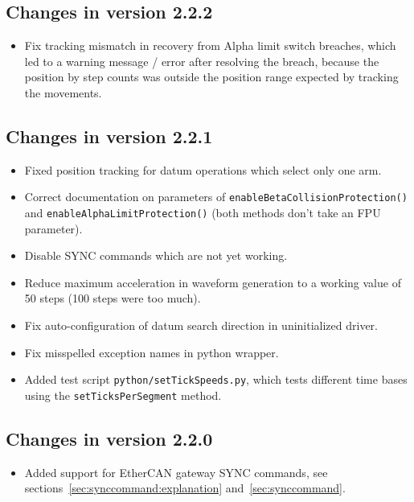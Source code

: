 \documentclass[fontsize=12,a4paper]{scrreprt}
\begin{document}
\subsection*{Changes in version 2.2.2}
\begin{itemize}
\item Fix tracking mismatch in recovery from
  Alpha limit switch breaches, which led to a
  warning message / error after resolving the breach,
  because the position by step counts was outside
  the position range expected by tracking the
  movements.
\end{itemize}

\subsection*{Changes in version 2.2.1}
\begin{itemize}
\item Fixed position tracking for datum operations
  which select only one arm.
\item Correct documentation on parameters of \texttt{enableBetaCollisionProtection()}
  and \texttt{enableAlphaLimitProtection()} (both methods don't take an
  FPU parameter).
\item Disable SYNC commands which are not yet working.
\item Reduce maximum acceleration in waveform generation to
  a working value of 50 steps (100 steps were too much).
\item Fix auto-configuration of datum search direction
  in uninitialized driver.
\item Fix misspelled exception names in python wrapper.
\item Added test script \texttt{python/setTickSpeeds.py}, which tests
  different time bases using the \texttt{setTicksPerSegment} method.
\end{itemize}


\subsection*{Changes in version 2.2.0}
\begin{itemize}
\item Added support for EtherCAN gateway SYNC commands, see
  sections~\ref{sec:synccommand:explanation} and~\ref{sec:synccommand}.
\end{itemize}
\end{document}
